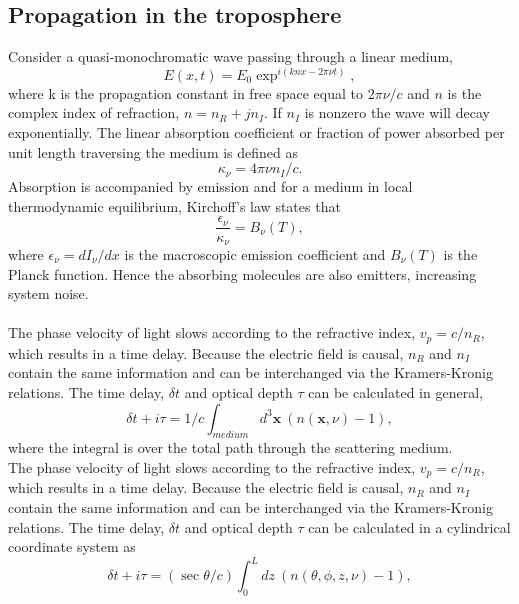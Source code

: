 \subsection{Propagation in the troposphere}

Consider a quasi-monochromatic wave passing through a linear medium,
\begin{equation}
E(x,t) = E_0 \exp^{i(knx - 2\pi\nu t)},
\end{equation}		
where k is the propagation constant in free space equal to $2\pi \nu/c$ and $n$ is the complex index of refraction, $n= n_R + j n_I$. If $n_I$ is nonzero the wave will decay exponentially. The linear absorption coefficient or fraction of power absorbed per unit length traversing the medium is defined as 
\begin{equation}
\kappa_\nu = 4\pi \nu n_I/c.
\end{equation}
Absorption is accompanied by emission and for a medium in local thermodynamic equilibrium, Kirchoff's law states that 
\begin{equation}\label{kirchoff}
\frac{\epsilon_\nu}{\kappa_\nu}=B_\nu(T),
\end{equation}
where $\epsilon_\nu = dI_\nu/dx$ is the macroscopic emission coefficient and $B_\nu(T)$ is the Planck function. Hence the absorbing molecules are also emitters, increasing system noise.\\
~\\
The phase velocity of light slows according to the refractive index, $v_p = c/n_R$, which results in a time delay.  Because the electric field is causal, $n_R$ and $n_I$ contain the same information and can be interchanged via the Kramers-Kronig relations. The time delay, $\delta t$ and optical depth $\tau$ can be calculated in general,
\begin{equation}\label{timedelay}
\delta t + i \tau =1/c \int_{medium} d^3\mathbf{x}\  (n(\mathbf{x}, \nu) -1),
\end{equation}
where the integral is over the total path through the scattering medium.
~\\
The phase velocity of light slows according to the refractive index, $v_p = c/n_R$, which results in a time delay.  Because the electric field is causal, $n_R$ and $n_I$ contain the same information and can be interchanged via the Kramers-Kronig relations. The time delay, $\delta t$ and optical depth $\tau$ can be calculated in a cylindrical coordinate system as  
\begin{equation}
\delta t + i \tau = (\sec\theta/c) \int_{0}^{L} dz\  (n(\theta, \phi, z, \nu) -1),
\end{equation}
